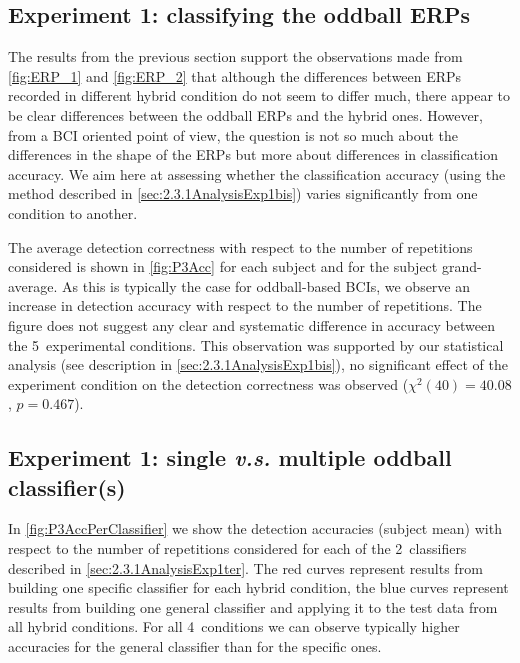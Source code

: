 \documentclass[10pt]{article}
\begin{document}
    \subsection{Experiment 1: classifying the oddball \acsp{ERP}}
    \label{sec:3.1bOddball}
    The results from the previous section support the observations made from \autoref{fig:ERP_1} and \autoref{fig:ERP_2} that although the differences between ERPs recorded in different hybrid condition do not seem to differ much, there appear to be clear differences between the oddball ERPs and the hybrid ones.
    However, from a BCI oriented point of view, the question is not so much about the differences in the shape of the ERPs but more about differences in classification accuracy.
    We aim here at assessing whether the classification accuracy (using the method described in \autoref{sec:2.3.1AnalysisExp1bis}) varies significantly from one condition to another.

    The average detection correctness with respect to the number of repetitions considered is shown in \autoref{fig:P3Acc} for each subject and for the subject grand-average.
    As this is typically the case for oddball-based BCIs, we observe an increase in detection accuracy with respect to the number of repetitions.
    The figure does not suggest any clear and systematic difference in accuracy between the 5~experimental conditions.
    This observation was supported by our statistical analysis (see description in \autoref{sec:2.3.1AnalysisExp1bis}), no significant effect of the experiment condition on the detection correctness was observed ($\chi^2(40)=40.08$, $p=0.467$).

    \subsection{Experiment 1: single \emph{v.s.} multiple oddball classifier(s)}
    \label{sec:3.1cOddball}

    In \autoref{fig:P3AccPerClassifier} we show the detection accuracies (subject mean) with respect to the number of repetitions considered for each of the 2~classifiers described in \autoref{sec:2.3.1AnalysisExp1ter}.
    The red curves represent results from building one specific classifier for each hybrid condition, the blue curves represent results from building one general classifier and applying it to the test data from all hybrid conditions.
    For all 4~conditions we can observe typically higher accuracies for the general classifier than for the specific ones.
\end{document}
